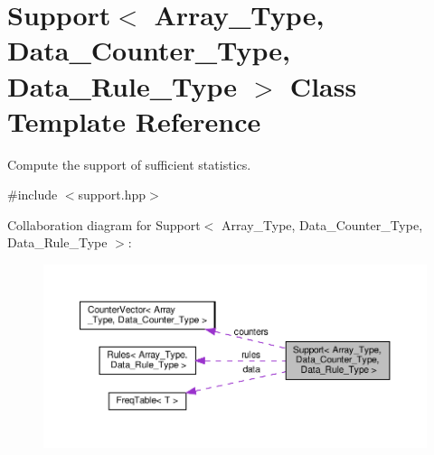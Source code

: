 \hypertarget{class_support}{}\section{Support$<$ Array\+\_\+\+Type, Data\+\_\+\+Counter\+\_\+\+Type, Data\+\_\+\+Rule\+\_\+\+Type $>$ Class Template Reference}
\label{class_support}


Compute the support of sufficient statistics.  




{\ttfamily \#include $<$support.\+hpp$>$}



Collaboration diagram for Support$<$ Array\+\_\+\+Type, Data\+\_\+\+Counter\+\_\+\+Type, Data\+\_\+\+Rule\+\_\+\+Type $>$\+:\nopagebreak
\begin{figure}[H]
\begin{center}
\leavevmode
\includegraphics[width=350pt]{class_support__coll__graph}
\end{center}
\end{figure}
